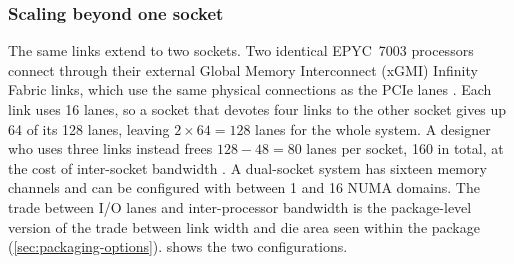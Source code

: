 \subsubsection*{Scaling beyond one socket}
The same links extend to two sockets. Two identical EPYC~7003 processors connect through their external Global Memory Interconnect (xGMI) Infinity Fabric links, which use the same physical connections as the PCIe lanes \cite{amd2022epyc7003}. Each link uses 16 lanes, so a socket that devotes four links to the other socket gives up 64 of its 128 lanes, leaving $2 \times 64 = 128$ lanes for the whole system. A designer who uses three links instead frees $128 - 48 = 80$ lanes per socket, 160 in total, at the cost of inter-socket bandwidth \cite{amd2022epyc7003}. A dual-socket system has sixteen memory channels and can be configured with between 1 and 16 NUMA domains. The trade between I/O lanes and inter-processor bandwidth is the package-level version of the trade between link width and die area seen within the package (\cref{sec:packaging-options}).  shows the two configurations.

